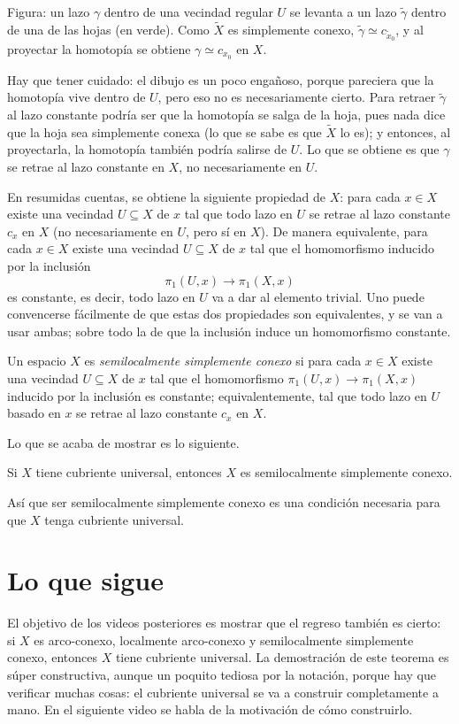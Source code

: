\documentclass[11pt]{article}
\begin{document}
\noindent Figura: un lazo $\gamma$ dentro de una vecindad regular $U$ se levanta a un lazo $\tilde\gamma$ dentro de una de las hojas (en verde). Como $\tilde X$ es simplemente conexo, $\tilde\gamma\simeq c_{\tilde x_0}$, y al proyectar la homotopía se obtiene $\gamma\simeq c_{x_0}$ en $X$.

Hay que tener cuidado: el dibujo es un poco engañoso, porque pareciera que la homotopía vive dentro de $U$, pero eso no es necesariamente cierto. Para retraer $\tilde\gamma$ al lazo constante podría ser que la homotopía se salga de la hoja, pues nada dice que la hoja sea simplemente conexa (lo que se sabe es que $\tilde X$ lo es); y entonces, al proyectarla, la homotopía también podría salirse de $U$. Lo que se obtiene es que $\gamma$ se retrae al lazo constante en $X$, no necesariamente en $U$.

En resumidas cuentas, se obtiene la siguiente propiedad de $X$: para cada $x\in X$ existe una vecindad $U\subseteq X$ de $x$ tal que todo lazo en $U$ se retrae al lazo constante $c_x$ en $X$ (no necesariamente en $U$, pero sí en $X$). De manera equivalente, para cada $x\in X$ existe una vecindad $U\subseteq X$ de $x$ tal que el homomorfismo inducido por la inclusión
\[
  \pi_1(U,x)\to\pi_1(X,x)
\]
es constante, es decir, todo lazo en $U$ va a dar al elemento trivial. Uno puede convencerse fácilmente de que estas dos propiedades son equivalentes, y se van a usar ambas; sobre todo la de que la inclusión induce un homomorfismo constante.

\begin{defn}\label{def:slsc}
Un espacio $X$ es \emph{semilocalmente simplemente conexo} si para cada $x\in X$ existe una vecindad $U\subseteq X$ de $x$ tal que el homomorfismo $\pi_1(U,x)\to\pi_1(X,x)$ inducido por la inclusión es constante; equivalentemente, tal que todo lazo en $U$ basado en $x$ se retrae al lazo constante $c_x$ en $X$.
\end{defn}

Lo que se acaba de mostrar es lo siguiente.

\begin{prop}\label{prop:necesaria}
Si $X$ tiene cubriente universal, entonces $X$ es semilocalmente simplemente conexo.
\end{prop}

Así que ser semilocalmente simplemente conexo es una condición necesaria para que $X$ tenga cubriente universal.

\section*{Lo que sigue}

El objetivo de los videos posteriores es mostrar que el regreso también es cierto: si $X$ es arco-conexo, localmente arco-conexo y semilocalmente simplemente conexo, entonces $X$ tiene cubriente universal. La demostración de este teorema es súper constructiva, aunque un poquito tediosa por la notación, porque hay que verificar muchas cosas: el cubriente universal se va a construir completamente a mano. En el siguiente video se habla de la motivación de cómo construirlo.
\end{document}
